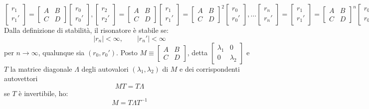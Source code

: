 \documentclass{book}
\def \l {\lambda}
\theoremstyle{remark}
\begin{document}
\begin{equation*}
\begin{bmatrix}
r_1\\
r_1'
\end{bmatrix} = 
\begin{bmatrix}
A	&	B\\
C	&	D
\end{bmatrix}
\begin{bmatrix}
r_0\\
r_0'
\end{bmatrix},
\begin{bmatrix}
r_2\\
r_2'
\end{bmatrix} = 
\begin{bmatrix}
A	&	B\\
C	&	D
\end{bmatrix}
\begin{bmatrix}
r_1\\
r_1'
\end{bmatrix} =
\begin{bmatrix}
A	&	B\\
C	&	D
\end{bmatrix}^2
\begin{bmatrix}
r_0\\
r_0'
\end{bmatrix},\dots
\begin{bmatrix}
r_n\\
r_n'
\end{bmatrix}
=\begin{bmatrix}
r_1\\
r_1'
\end{bmatrix} = 
\begin{bmatrix}
A	&	B\\
C	&	D
\end{bmatrix}^n
\begin{bmatrix}
r_0\\
r_0'
\end{bmatrix}
\end{equation*}
Dalla definizione di stabilità, il risonatore è stabile se:
\begin{equation*}
|r_n| < \infty, \qquad |r_n'| < \infty
\end{equation*}
per $n\rightarrow \infty$, qualunque sia $(r_0, r_0')$.
Posto $M \equiv \begin{bmatrix}
A	&	B\\
C	&	D
\end{bmatrix}$, detta $\begin{bmatrix}
\l_1	&	0\\
0	&	\l_2
\end{bmatrix}$ e $T$ la matrice diagonale $\Lambda$ degli autovalori $(\l_1,\l_2)$ di $M$ e dei corrispondenti autovettori
\begin{equation*}
MT = T\Lambda
\end{equation*}
se $T$ è invertibile, ho:
\begin{equation*}
M = T\Lambda T^{-1}
\end{equation*}
\end{document}
